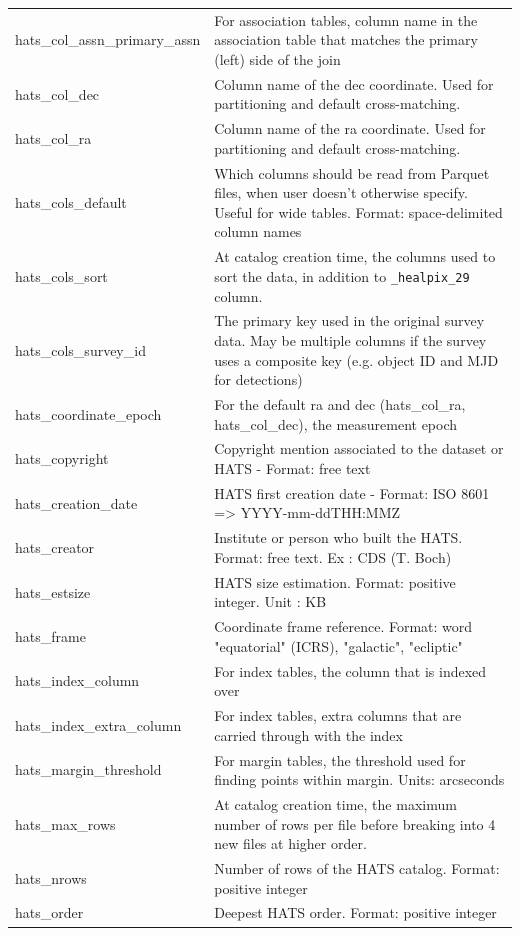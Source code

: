 \documentclass[11pt,a4paper]{ivoa}
\begin{document}
{\begin{longtable}[h!]{D{0.33\textwidth} D{0.67\textwidth}}
hats\_col\_assn\_primary\_assn &For association tables, column name in the association table that matches the primary (left) side of the join \\
hats\_col\_dec &Column name of the dec coordinate. Used for partitioning and default cross-matching. \\
hats\_col\_ra &Column name of the ra coordinate. Used for partitioning and default cross-matching. \\
hats\_cols\_default &Which columns should be read from Parquet files, when user doesn't otherwise specify. Useful for wide tables. Format: space-delimited column names \\
hats\_cols\_sort &At catalog creation time, the columns used to sort the data, in addition to \texttt{\_healpix\_29} column. \\
hats\_cols\_survey\_id &The primary key used in the original survey data. May be multiple columns if the survey uses a composite key (e.g. object ID and MJD for detections) \\
hats\_coordinate\_epoch &For the default ra and dec (hats\_col\_ra, hats\_col\_dec), the measurement epoch \\
hats\_copyright &Copyright mention associated to the dataset or HATS - Format: free text \\
hats\_creation\_date &HATS first creation date - Format: ISO 8601 => YYYY-mm-ddTHH:MMZ \\
hats\_creator &Institute or person who built the HATS. Format: free text. Ex : CDS (T. Boch) \\
hats\_estsize &HATS size estimation. Format: positive integer. Unit : KB \\
hats\_frame &Coordinate frame reference. Format: word "equatorial" (ICRS), "galactic", "ecliptic" \\
hats\_index\_column &For index tables, the column that is indexed over \\
hats\_index\_extra\_column &For index tables, extra columns that are carried through with the index \\
hats\_margin\_threshold &For margin tables, the threshold used for finding points within margin. Units: arcseconds \\
hats\_max\_rows &At catalog creation time, the maximum number of rows per file before breaking into 4 new files at higher order. \\
hats\_nrows &Number of rows of the HATS catalog. Format: positive integer \\
hats\_order &Deepest HATS order. Format: positive integer \\

\end{longtable}}
\end{document}
